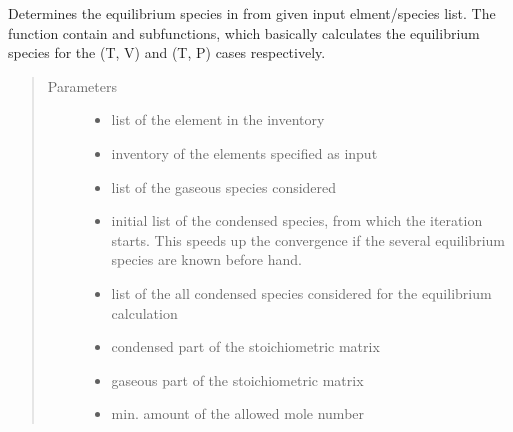 \documentclass[letterpaper,10pt,english]{sphinxmanual}
\begin{document}
\begin{fulllineitems}
Determines the equilibrium species in from given input elment/species list. The function contain  and  sub\sphinxhyphen{}functions, which basically calculates the equilibrium species for the (T, V) and (T, P) cases respectively.
\begin{quote}\begin{description}
\item[{Parameters}] \leavevmode\begin{itemize}
\item {} 
 \textendash{} list of the element in the inventory

\item {} 
 \textendash{} inventory of the elements specified as input

\item {} 
 \textendash{} list of the gaseous species considered

\item {} 
 \textendash{} initial list of the condensed species, from which the iteration starts. This speeds up the convergence if the several equilibrium species are known before hand.

\item {} 
 \textendash{} list of the all condensed species
considered for the equilibrium calculation

\item {} 
 \textendash{} condensed part of the stoichiometric matrix

\item {} 
 \textendash{} gaseous part of the stoichiometric matrix

\item {} 
 \textendash{} min. amount of the allowed mole number


\end{itemize}
\end{description}
\end{quote}
\end{fulllineitems}
\end{document}
